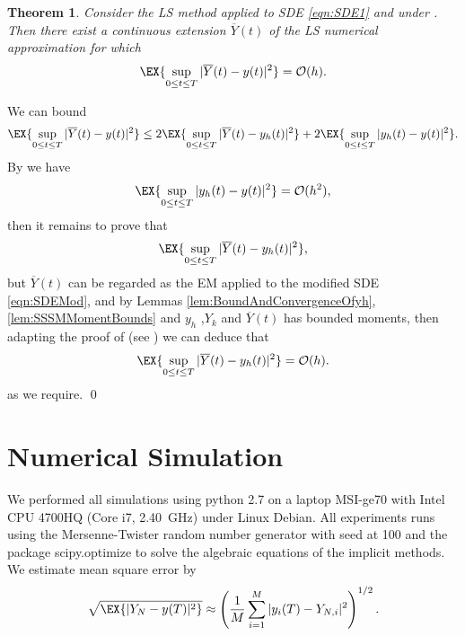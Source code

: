 \documentclass[sort&compress, preprint]{elsarticle}
\theoremstyle{definition}
\theoremstyle{plain}%
\newtheorem{thm}{Theorem}[section]
\theoremstyle{remark}
\newcommand{\SM}{LS\xspace}
\begin{document}
\begin{thm}
	Consider the \SM method applied to SDE \eqref{eqn:SDE1} and under .
	Then there exist a continuous extension $\overline{Y}(t)$ of the LS numerical approximation for which
	\begin{equation*}
		\EX{
			\sup_{0 \leq t \leq T}
			|\overline{Y}(t) - y(t)|^2	
		} = \mathcal{O}(h).	
	\end{equation*}
\end{thm}
\begin{pf}
	 We can bound
	\begin{align*}
		\EX{
			\sup_{0 \leq t \leq T}	
			|\overline{Y}(t) - y(t)|^2
		}
		&\leq 
		2 \EX{
			\sup_{0 \leq t \leq T}	
			|\overline{Y}(t) - y_h(t)|^2
		}
		+
		2 \EX{
			\sup_{0 \leq t \leq T}	
			|y_h(t) - y(t) |^2
		}.\\		
	\end{align*}	
	By  we have
	$$
		\EX{
			\sup_{0 \leq t \leq T}	
			|y_h(t) - y(t) |^2 
		}= \mathcal{O}(h^2),
	$$
	then it remains to prove that 
	$$
		\EX{
			\sup_{0 \leq t \leq T}	
			|\overline{Y}(t) - y_h(t)|^2
		},
	$$
	but  $\overline{Y}(t)$ can be regarded as the EM applied to the modified SDE \eqref{eqn:SDEMod}, and by
	Lemmas \eqref{lem:BoundAndConvergenceOfyh},\eqref{lem:SSSMMomentBounds} and 
	$y_h$ ,$Y_k$ and $\overline{Y}(t)$ has bounded moments, then adapting the proof of 
	 (see \cite[Thm. 4.4]{Higham2002b}) we can deduce that
	\begin{equation*}
		\EX{
			\sup_{0 \leq t \leq T}	
			|\overline{Y}(t) - y_h(t)|^2
		} = \mathcal{O}(h).
	\end{equation*}
	as we require. \qed
\end{pf}
%


	\section{Numerical Simulation}

We performed all simulations using python 2.7 on a laptop MSI-ge70 with Intel CPU 4700HQ 
(Core i7, \SI{2.40}{\giga\hertz}) under Linux Debian. All experiments runs using  the Mersenne-Twister random number 
generator with seed at \num{100} and the  package scipy.optimize to solve the algebraic equations of the implicit 
methods. We estimate mean square error by 
\begin{equation}
	\sqrt{\EX{|Y_N - y(T)|^2}} \approx
	\left(
	\frac{1}{M}
	\sum_{i=1}^M
	|y_i(T) - Y_{N,i}|^2	
	\right)^{1/2}.
\end{equation}
\end{document}
